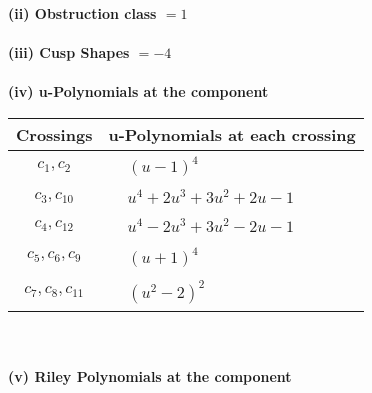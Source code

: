 \documentclass[1p]{elsarticle_modified}
\theoremstyle{definition}
\begin{document}
\flushleft \textbf{(ii) Obstruction class $= 1$}\\~\\
\flushleft \textbf{(iii) Cusp Shapes $= -4$}\\~\\
\newpage\renewcommand{\arraystretch}{1}
\flushleft \textbf{(iv) u-Polynomials at the component}\newline \\
\begin{tabular}{m{50pt}|m{274pt}}
Crossings & \hspace{64pt}u-Polynomials at each crossing \\
\hline $$\begin{aligned}c_{1},c_{2}\end{aligned}$$&$\begin{aligned}
&(u-1)^4
\end{aligned}$\\
\hline $$\begin{aligned}c_{3},c_{10}\end{aligned}$$&$\begin{aligned}
&u^4+2 u^3+3 u^2+2 u-1
\end{aligned}$\\
\hline $$\begin{aligned}c_{4},c_{12}\end{aligned}$$&$\begin{aligned}
&u^4-2 u^3+3 u^2-2 u-1
\end{aligned}$\\
\hline $$\begin{aligned}c_{5},c_{6},c_{9}\end{aligned}$$&$\begin{aligned}
&(u+1)^4
\end{aligned}$\\
\hline $$\begin{aligned}c_{7},c_{8},c_{11}\end{aligned}$$&$\begin{aligned}
&(u^2-2)^2
\end{aligned}$\\
\hline
\end{tabular}\\~\\
\newpage\renewcommand{\arraystretch}{1}
\flushleft \textbf{(v) Riley Polynomials at the component}\newline \\
\end{document}
